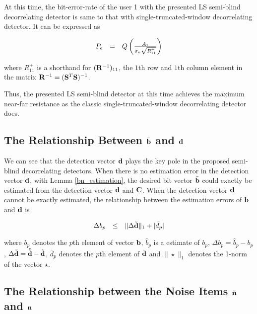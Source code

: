 \documentclass[a4paper,10pt,fleqn, twocolumn]{IEEETran}
\newcommand{\bb}{{\bf b}}
\newcommand{\bC}{{\bf C}}
\newcommand{\bd}{{\bf d}}
\newcommand{\bn}{{\bf n}}
\newcommand{\bS}{{\bf S}}
\newcommand{\bR}{{\bf R}}
\begin{document}
At this time, the bit-error-rate of the user 1 with the presented
LS semi-blind decorrelating detector is same to that with
single-truncated-window decorrelating detector. It can be
expressed as

\begin{equation}
\begin{array}{rcl}
P_{e}&=&Q\left({A_1\over \sigma_{n}\sqrt{R_{11}^+}}\right)
\end{array}
\end{equation}

\noindent where $R_{11}^+$ is a shorthand for $(\bR^{-1})_{11}$,
the $1$th row and $1$th column element in the matrix
$\bR^{-1}=(\bS^T\bS)^{-1}$.

Thus, the presented LS semi-blind detector at this time achieves
the maximum near-far resistance as the classic
single-truncated-window decorrelating detector does.

\subsection{The Relationship Between $\bar\bb$ and $\bd$}

We can see that the detection vector $\bd$ plays the key pole in
the proposed semi-blind decorrelating detectors. When there is no
estimation error in the detection vector $\bd$, with Lemma
\ref{bn_estimation}, the desired bit vector $\bar\bb$ could
exactly be estimated from the detection vector $\bd$ and $\bC$.
When the detection vector $\bd$ cannot be exactly estimated, the
relationship between the estimation errors of $\bar\bb$ and $\bd$
is

\begin{equation}
\begin{array}{rcl}
\Delta b_p&\leq&\|\Delta\tilde{\bd}\|_1+|\bar{d}_p|
\end{array}\label{b_error}
\end{equation}

\noindent where $b_p$ denotes the $p$th element of vector $\bb$,
$\hat{b}_p$ is a estimate of $b_p$, $\Delta b_p=\hat{b}_p-b_p$,
$\Delta\tilde{\bd}=\hat{\tilde{\bd}}-\tilde{\bd}$, $\bar{d}_p$
denotes the $p$th element of $\bar\bd$ and $\|\star\|_1$ denotes
the 1-norm of the vector $\star$.

\subsection{The Relationship between the Noise Items $\tilde{\bn}$ and $\bn$}
\end{document}
